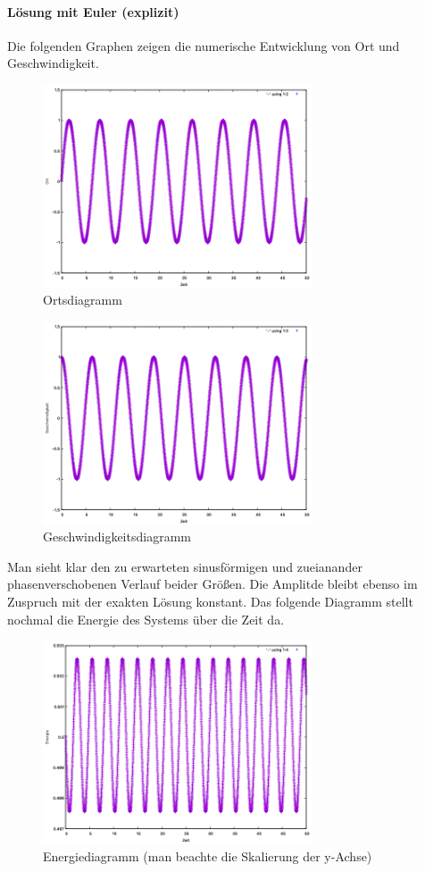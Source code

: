 \documentclass[
    oneside,
    ngerman,
    footinclude=false,
    captions=tableheading,
    DIV=12
]{scrartcl}
\begin{document}
    \aufgabe{}
        \subaufgabe{}
            \paragraph*{Lösung mit Euler (explizit)}
                Die folgenden Graphen zeigen die numerische Entwicklung von Ort und Geschwindigkeit.
                \begin{figure}[H]
                    \centering
                    \includegraphics[width=8cm]{Bilddateien/expEulerA1(a)-001h-x.png}
                    \caption{Ortsdiagramm}
                \end{figure}
                \begin{figure}[H]
                    \centering
                    \includegraphics[width=8cm]{Bilddateien/expEulerA1(a)-001h-v.png}
                    \caption{Geschwindigkeitsdiagramm}
                \end{figure}
                Man sieht klar den zu erwarteten sinusförmigen und zueianander phasenverschobenen Verlauf beider Größen. Die Amplitde bleibt ebenso im Zuspruch mit der exakten Lösung konstant. Das folgende Diagramm stellt nochmal die Energie des Systems über die Zeit da.
                \begin{figure}[H]
                    \centering
                    \includegraphics[width=8cm]{Bilddateien/expEulerA1(a)-001h-E.png}
                    \caption{Energiediagramm (man beachte die Skalierung der y-Achse)}
                \end{figure}
\end{document}
